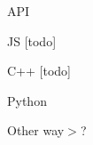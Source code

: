 A\-P\-I
\begin{DoxyItemize}
\item J\-S \mbox{[}todo\mbox{]}
\item C++ \mbox{[}todo\mbox{]}
\item Python
\end{DoxyItemize}

Other way$>$? 